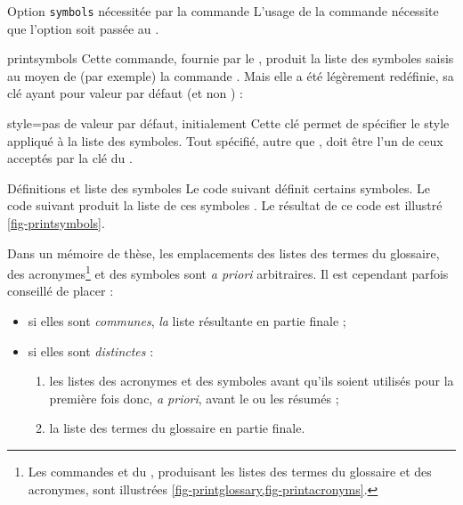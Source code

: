 \begin{dbwarning}{Option \texttt{symbols} nécessitée par la commande
    \protect{}}{}
  L'usage de la commande  nécessite que l'option
   soit passée au .
\end{dbwarning}

\begin{docCommand}{printsymbols}{}
  Cette commande, fournie par le , produit la liste des
  symboles saisis au moyen de (par exemple) la commande
  . Mais elle a été légèrement redéfinie, sa clé
   ayant pour valeur par défaut  (et non
  ) :
  \begin{docKey}{style}{=\textbar{}}{pas de valeur
      par défaut, initialement }
    Cette clé permet de spécifier le style appliqué à la liste des
    symboles. Tout  spécifié, autre que ,
    doit être l'un de ceux acceptés par la clé  du
    .
  \end{docKey}
\end{docCommand}

\begin{dbexample}{Définitions et liste des symboles}{}
  Le code suivant définit certains symboles.
  Le code suivant produit la liste de ces symboles .
  Le résultat de ce code est illustré \vref{fig-printsymbols}.
\end{dbexample}

Dans un mémoire de thèse, les emplacements des listes des termes du glossaire,
des acronymes\footnote{Les commandes  et
   du , produisant les listes
  des termes du glossaire et des acronymes, sont illustrées
  \vref{fig-printglossary,fig-printacronyms}.} et des symboles sont \emph{a
  priori} arbitraires. Il est cependant parfois conseillé de placer :
\begin{itemize}
\item si elles sont \emph{communes}, \emph{la} liste résultante en partie finale ;
\item si elles sont \emph{distinctes} :
  \begin{enumerate}
  \item les listes des acronymes et des symboles avant qu'ils soient utilisés
    pour la première fois donc, \emph{a priori}, avant le ou les résumés ;
  \item la liste des termes du glossaire en partie finale.
  \end{enumerate}
\end{itemize}

